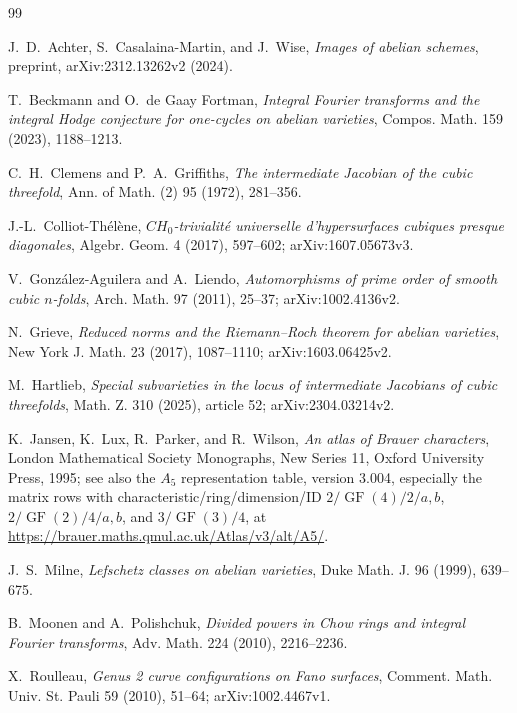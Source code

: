 \documentclass[11pt]{article}
\numberwithin{equation}{section}
\theoremstyle{definition}
\theoremstyle{remark}
\begin{document}
\begin{thebibliography}{99}

\begingroup\raggedright
J.~D.~Achter, S.~Casalaina-Martin, and J.~Wise,
\emph{Images of abelian schemes},
preprint, arXiv:2312.13262v2 (2024).\par
\endgroup

T.~Beckmann and O.~de Gaay Fortman,
\emph{Integral Fourier transforms and the integral Hodge conjecture for
one-cycles on abelian varieties}, Compos. Math. 159 (2023), 1188--1213.

C.~H.~Clemens and P.~A.~Griffiths,
\emph{The intermediate Jacobian of the cubic threefold},
Ann. of Math. (2) 95 (1972), 281--356.


J.-L.~Colliot-Th\'el\`ene,
\emph{\(CH_0\)-trivialit\'e universelle d'hypersurfaces cubiques presque
diagonales}, Algebr. Geom. 4 (2017), 597--602; arXiv:1607.05673v3.

V.~Gonz\'alez-Aguilera and A.~Liendo,
\emph{Automorphisms of prime order of smooth cubic \(n\)-folds},
Arch. Math. 97 (2011), 25--37; arXiv:1002.4136v2.

N.~Grieve,
\emph{Reduced norms and the Riemann--Roch theorem for abelian varieties},
New York J. Math. 23 (2017), 1087--1110; arXiv:1603.06425v2.

M.~Hartlieb,
\emph{Special subvarieties in the locus of intermediate Jacobians of cubic
threefolds}, Math. Z. 310 (2025), article 52; arXiv:2304.03214v2.

K.~Jansen, K.~Lux, R.~Parker, and R.~Wilson,
\emph{An atlas of Brauer characters}, London Mathematical Society Monographs,
New Series 11, Oxford University Press, 1995; see also the \(A_5\)
representation table, version 3.004, especially the matrix rows with
characteristic/ring/dimension/ID
\(2/\operatorname{GF}(4)/2/a,b\),
\(2/\operatorname{GF}(2)/4/a,b\), and
\(3/\operatorname{GF}(3)/4\), at
\url{https://brauer.maths.qmul.ac.uk/Atlas/v3/alt/A5/}.

J.~S.~Milne,
\emph{Lefschetz classes on abelian varieties},
Duke Math. J. 96 (1999), 639--675.

B.~Moonen and A.~Polishchuk,
\emph{Divided powers in Chow rings and integral Fourier transforms},
Adv. Math. 224 (2010), 2216--2236.

X.~Roulleau,
\emph{Genus 2 curve configurations on Fano surfaces},
Comment. Math. Univ. St. Pauli 59 (2010), 51--64;
arXiv:1002.4467v1.


\end{thebibliography}
\end{document}
